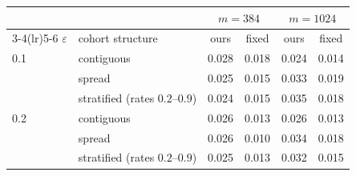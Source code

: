\begin{tabular}{llcccc}
\toprule
& & \multicolumn{2}{c}{$m=384$} & \multicolumn{2}{c}{$m=1024$}\\
\cmidrule(lr){3-4}\cmidrule(lr){5-6}
$\varepsilon$ & cohort structure & ours & fixed & ours & fixed\\
\midrule
0.1 & contiguous & 0.028 & 0.018 & 0.024 & 0.014\\
 & spread & 0.025 & 0.015 & 0.033 & 0.019\\
 & stratified (rates $0.2$--$0.9$) & 0.024 & 0.015 & 0.035 & 0.018\\
0.2 & contiguous & 0.026 & 0.013 & 0.026 & 0.013\\
 & spread & 0.026 & 0.010 & 0.034 & 0.018\\
 & stratified (rates $0.2$--$0.9$) & 0.025 & 0.013 & 0.032 & 0.015\\
\bottomrule
\end{tabular}
